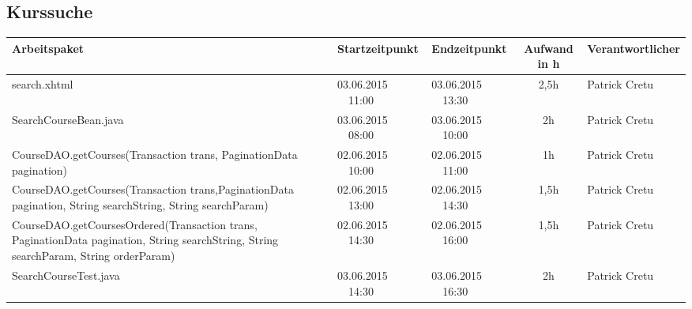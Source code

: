 \begin{landscape}
\subsection{Kurssuche}
\begin{tabular}{|p{10.3cm}|p{3.2cm}|p{3.2cm}|c|p{3.5cm}|}
	\hline  \textbf{Arbeitspaket} & \textbf{Startzeitpunkt} & \textbf{Endzeitpunkt} & \textbf{Aufwand in h} & \textbf{Verantwortlicher} \\ 
	\hline   search.xhtml                                         & 03.06.2015 \ \ 11:00        & 03.06.2015 \ \ 13:30        &  2,5h                 & Patrick Cretu\\ 
	\hline   SearchCourseBean.java                                & 03.06.2015 \ \ 08:00        & 03.06.2015 \ \ 10:00        &  2h                 & Patrick Cretu\\ 
	\hline   CourseDAO.getCourses(Transaction trans, PaginationData pagination)    & 02.06.2015 \ \ 10:00        & 02.06.2015 \ \ 11:00        &  1h                 & Patrick Cretu\\ 
	\hline  CourseDAO.getCourses(Transaction trans,PaginationData pagination, String searchString, String searchParam)& 02.06.2015 \ \ 13:00        & 02.06.2015 \ \ 14:30        &  1,5h                 & Patrick Cretu\\ 
	\hline  CourseDAO.getCoursesOrdered(Transaction trans, PaginationData pagination, String searchString, String searchParam, String orderParam)& 02.06.2015 \ \ 14:30        & 02.06.2015 \ \ 16:00        &  1,5h                 & Patrick Cretu\\ 
	\hline SearchCourseTest.java & 03.06.2015  \ \ 14:30 & 03.06.2015 \ \ 16:30 & 2h & Patrick Cretu\\
	\hline 
\end{tabular} \ \\
\ \\
\end{landscape}



